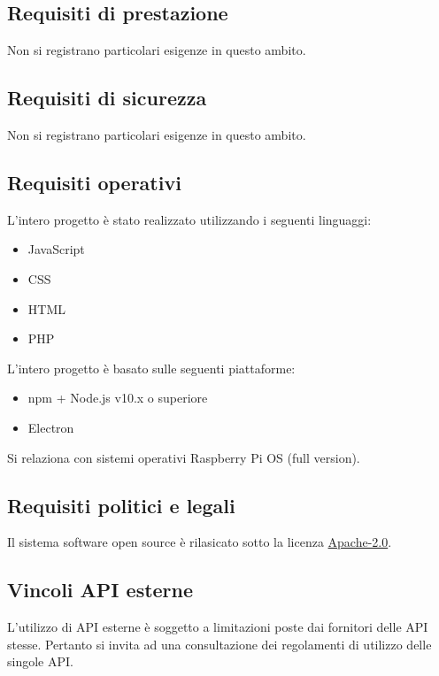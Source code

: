 \documentclass[a4paper,11pt]{article}       %
\begin{document}
    \subsection{Requisiti di prestazione}
        Non si registrano particolari esigenze in questo ambito.
    
    \subsection{Requisiti di sicurezza}
        Non si registrano particolari esigenze in questo ambito.
    
    \subsection{Requisiti operativi}
        L'intero progetto è stato realizzato utilizzando i seguenti linguaggi:
        \begin{itemize}
            \item JavaScript
            \item CSS
            \item HTML
            \item PHP
        \end{itemize}
        L'intero progetto è basato sulle seguenti piattaforme:
        \begin{itemize}
            \item npm + Node.js v10.x o superiore
            \item Electron
        \end{itemize}
        Si relaziona con sistemi operativi Raspberry Pi OS (full version).
    
    \subsection{Requisiti politici e legali}
        Il sistema software open source è rilasicato sotto la licenza \href{https://github.com/AndreaGrandieri/MagicMirror-GBM/blob/main/LICENSE}{Apache-2.0}.
    
    \subsection{Vincoli API esterne}
        L'utilizzo di API esterne è soggetto a limitazioni poste dai fornitori delle API stesse. Pertanto si invita ad una consultazione dei regolamenti di utilizzo delle singole API.
\clearpage
    \printglossary[nonumberlist]
\end{document}

